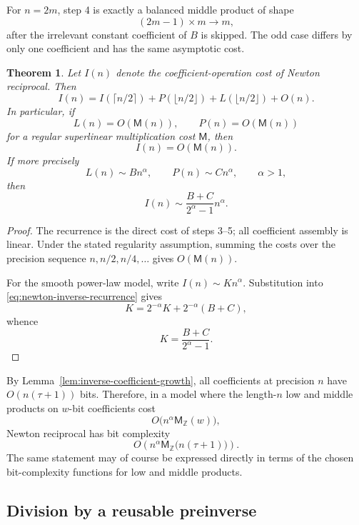 \documentclass[11pt]{book}
\newtheorem{theorem}{Theorem}[section]
\theoremstyle{definition}
\newcommand{\ZZ}{\mathbb Z}
\newcommand{\MZ}{\mathsf M_{\ZZ}}
\begin{document}
For $n=2m$, step 4 is exactly a balanced middle product of shape
\[
 (2m-1)\times m\longrightarrow m,
\]
after the irrelevant constant coefficient of $B$ is skipped.  The odd case
differs by only one coefficient and has the same asymptotic cost.

\begin{theorem}\label{thm:newton-reciprocal-complexity}
Let $I(n)$ denote the coefficient-operation cost of Newton reciprocal.  Then
\begin{equation}\label{eq:newton-inverse-recurrence}
 I(n)
 =I(\lceil n/2\rceil)
  +P(\lfloor n/2\rfloor)
  +L(\lfloor n/2\rfloor)
  +O(n).
\end{equation}
In particular, if
\[
 L(n)=O(\mathsf M(n)),\qquad P(n)=O(\mathsf M(n))
\]
for a regular superlinear multiplication cost $\mathsf M$, then
\[
 I(n)=O(\mathsf M(n)).
\]
If more precisely
\[
 L(n)\sim Bn^\alpha,
 \qquad
 P(n)\sim Cn^\alpha,
 \qquad \alpha>1,
\]
then
\begin{equation}\label{eq:newton-inverse-leading-constant}
 I(n)\sim\frac{B+C}{2^\alpha-1}n^\alpha.
\end{equation}
\end{theorem}

\begin{proof}
The recurrence is the direct cost of steps 3--5; all coefficient assembly is
linear.  Under the stated regularity assumption, summing the costs over the
precision sequence $n,n/2,n/4,\ldots$ gives $O(\mathsf M(n))$.

For the smooth power-law model, write $I(n)\sim Kn^\alpha$.  Substitution into
\eqref{eq:newton-inverse-recurrence} gives
\[
 K=2^{-\alpha}K+2^{-\alpha}(B+C),
\]
whence
\[
 K=\frac{B+C}{2^\alpha-1}.
\]
\end{proof}

By Lemma~\ref{lem:inverse-coefficient-growth}, all coefficients at precision
$n$ have $O(n(\tau+1))$ bits.  Therefore, in a model where the length-$n$ low
and middle products on $w$-bit coefficients cost
\[
 O\bigl(n^\alpha\MZ(w)\bigr),
\]
Newton reciprocal has bit complexity
\begin{equation}\label{eq:newton-inverse-bit-complexity}
 O\!\left(
 n^\alpha\MZ\bigl(n(\tau+1)\bigr)
 \right).
\end{equation}
The same statement may of course be expressed directly in terms of the chosen
bit-complexity functions for low and middle products.

\subsection{Division by a reusable preinverse}
\end{document}
